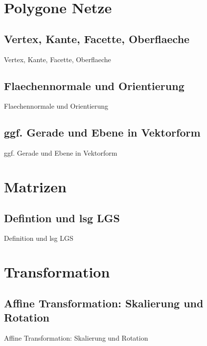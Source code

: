 \documentclass[10pt,aspectratio=169]{beamer}
\begin{document}
  \section{Polygone Netze}
  \subsection{Vertex, Kante, Facette, Oberflaeche}
  \begin{frame}{Vertex, Kante, Facette, Oberflaeche}
  \end{frame}

  \subsection{Flaechennormale und Orientierung}
  \begin{frame}{Flaechennormale und Orientierung}
  \end{frame}


  \subsection{ggf. Gerade und Ebene in Vektorform}
  \begin{frame}{ggf. Gerade und Ebene in Vektorform}
  \end{frame}

  \section{Matrizen}

  \subsection{Defintion und lsg LGS}
  \begin{frame}{Definition und lsg LGS}
  \end{frame}

  \section{Transformation}

  \subsection{Affine Transformation: Skalierung und Rotation}
  \begin{frame}{Affine Transformation: Skalierung und Rotation}
  \end{frame}
\end{document}
